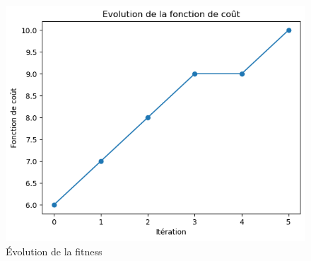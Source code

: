 \begin{figure}[!h]
    \begin{center}
        \includegraphics[scale=0.8]{ressources/taboueCoutGraph}
        \caption{Évolution de la fitness \label{fig:evolFitnessTaboue}}
    \end{center}
\end{figure}